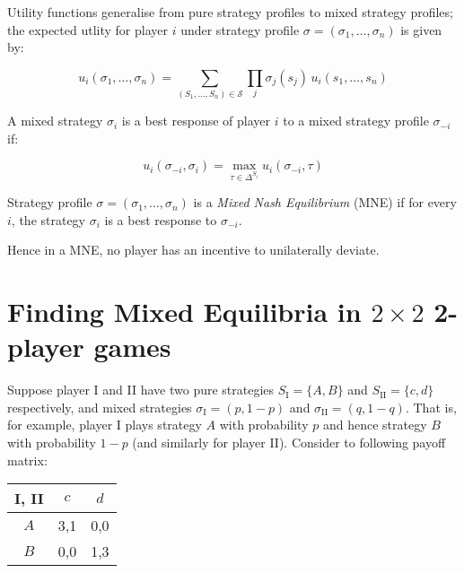\begin{definition}
	Utility functions generalise from pure strategy profiles to mixed strategy
	profiles; the expected utlity for player $i$ under strategy profile $\sigma
	= (\sigma_1, \ldots, \sigma_n)$ is given by:

	\begin{equation}
		\label{eq:expectedUtility}
		u_i(\sigma_1, \ldots, \sigma_n) = \sum_{(S_1, \ldots, S_n) \in
		\mathcal{S}} \prod_j \sigma_j(s_j) \, u_i(s_1, \ldots, s_n)
	\end{equation}
\end{definition}

\begin{definition}
	A mixed strategy $\sigma_i$ is a best response of player $i$ to a mixed
	strategy profile $\sigma_{-i}$ if:

	\begin{equation}
		u_i(\sigma_{-i}, \sigma_i) = \max_{\tau \in \Delta^{S_i}} u_i(\sigma_{-i}, \tau)
	\end{equation}
\end{definition}

\begin{definition}
	\label{def:BR}
	Strategy profile $\sigma = (\sigma_1, \ldots, \sigma_n)$ is a \textit{Mixed
	Nash Equilibrium} (MNE) if for every $i$, the strategy $\sigma_i$ is a best
	response to $\sigma_{-i}$.
\end{definition}

Hence in a MNE, no player has an incentive to unilaterally deviate.

\section{Finding Mixed Equilibria in $2\times2$ 2-player games}

Suppose player I and II have two pure strategies $S_\text{I} = \{A, B\}$ and
$S_\text{II} = \{c, d\}$ respectively, and mixed strategies $\sigma_{\text{I}}
= (p, 1-p)$ and $\sigma_{\text{II}} = (q, 1-q)$. That is, for example, player I
plays strategy $A$ with probability $p$ and hence strategy $B$ with probability
$1-p$ (and similarly for player II).  Consider to following payoff matrix:

\begin{center}
	\begin{tabular}{|c|c|c|}
		\hline
		I, II & $c$ & $d$ \\ \hline
		$A$ & 3,1 & 0,0 \\ \hline
		$B$ & 0,0 & 1,3 \\ \hline
	\end{tabular}
\end{center}

